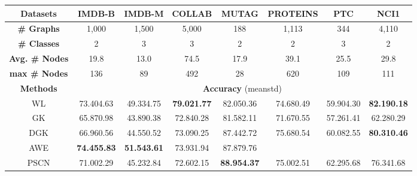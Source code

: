 \documentclass{article}
\newcommand{\our}{\textsc{Seg-Bert}}
\begin{document}
\begin{table*}[t]
\caption{Experimental results of different comparison methods. For the results not reported in the previous works, we mark the corresponding entries with `' in the table. The entries are the accuracy scores (meanstd) achieved by the baseline methods with the  folds. For {\our}(padding/pruning, none) and {\our}(padding/pruning, raw), they denote {\our} with the \textit{padding/pruning} strategy and different graph residual terms (raw vs none). At the last row on {\our}*, we show the best results obtained by {\our} with all these three unification strategies.}\label{tab:result}
\vspace{-5pt}
\centering
\small
\setlength{\tabcolsep}{3pt}
\renewcommand{\arraystretch}{1.2}
\begin{tabular}{c|c|c|c|c|c|c|c}
\hline
\textbf{Datasets} &\textbf{IMDB-B} &\textbf{IMDB-M} &\textbf{COLLAB} &\textbf{MUTAG}  &\textbf{PROTEINS} &\textbf{PTC} &\textbf{NCI1}\\
\hline
\textbf{\# Graphs} &1,000 &1,500 &5,000 &188  &1,113 &344 &4,110 \\
\textbf{\# Classes} &2 &3 &3 &2  &2 &3 &2\\
\textbf{Avg. \# Nodes} &19.8 &13.0 &74.5 &17.9 &39.1 &25.5 &29.8\\
\textbf{max \# Nodes} &136 &89 &492 &28 &620 &109 &111\\
\hline
\hline
\textbf{Methods} & \multicolumn{7}{c}{\textbf{Accuracy} (meanstd)}\\
\hline

WL {\scriptsize \cite{Shervashidze_WL_11}} &73.404.63 &49.334.75 &\textbf{79.021.77} &82.050.36 &74.680.49 &59.904.30 &\textbf{82.190.18} \\

GK {\scriptsize \cite{pmlr-v5-shervashidze09a}} &65.870.98&43.890.38  &72.840.28&81.582.11&71.670.55&57.261.41&62.280.29 \\

\hline

DGK {\scriptsize \cite{Yanardag_Deep_15}} &66.960.56&44.550.52 &73.090.25&87.442.72&75.680.54&60.082.55&\textbf{80.310.46} \\

AWE {\scriptsize \cite{Ivanov_Anonymous_18}} &\textbf{74.455.83}&\textbf{51.543.61} &73.931.94&87.879.76&&& \\

PSCN {\scriptsize \cite{Niepert_Learning_16}} &71.002.29&45.232.84 &72.602.15&\textbf{88.954.37}&75.002.51&62.295.68&76.341.68 \\


\end{tabular}
\end{table*}
\end{document}
